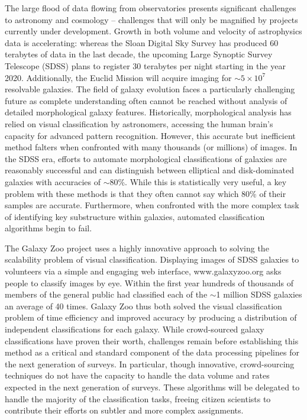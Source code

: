


The large flood of data flowing from observatories presents significant challenges to astronomy and cosmology -- challenges that will only be magnified by projects currently under development. Growth in both volume and velocity of astrophysics data is accelerating: whereas the Sloan Digital Sky Survey has produced 60 terabytes of data in the last decade, the upcoming Large Synoptic Survey Telescope (SDSS) plans to register 30 terabytes per night starting in the year 2020. Additionally, the Euclid Mission will acquire imaging for $\sim5\times10^7$ resolvable galaxies. The field of galaxy evolution faces a particularly challenging future as complete understanding often cannot be reached without analysis of detailed morphological galaxy features. Historically, morphological analysis has relied on visual classification by astronomers, accessing the human brain’s capacity for advanced pattern recognition. However, this accurate but inefficient method falters when confronted with many thousands (or millions) of images. In the SDSS era, efforts to automate morphological classifications of galaxies \citep[e.g.,][]{Conselice2000,Lotz2004} are reasonably successful and can distinguish between elliptical and disk-dominated galaxies with accuracies of $\sim$80\%. While this is statistically very useful, a key problem with these methods is that they often cannot say which 80\% of their samples are accurate. Furthermore, when confronted with the more complex task of identifying key substructure within galaxies, automated classification algorithms begin to fail.

The Galaxy Zoo project uses a highly innovative approach to solving the scalability problem of visual classification. Displaying images of SDSS galaxies to volunteers via a simple and engaging web interface, www.galaxyzoo.org asks people to classify images by eye. Within the first year hundreds of thousands of members of the general public had classified each of the $\sim$1 million SDSS galaxies an average of 40 times. Galaxy Zoo thus both solved the visual classification problem of time efficiency and improved accuracy by producing a distribution of independent classifications for each galaxy. While crowd-sourced galaxy classifications have proven their worth, challenges remain before establishing this method as a critical and standard component of the data processing pipelines for the next generation of surveys. In particular, though innovative, crowd-sourcing techniques do not have the capacity to handle the data volume and rates expected in the next generation of surveys. These algorithms will be delegated to handle the majority of the classification tasks, freeing citizen scientists to contribute their efforts on subtler and more complex assignments. 

